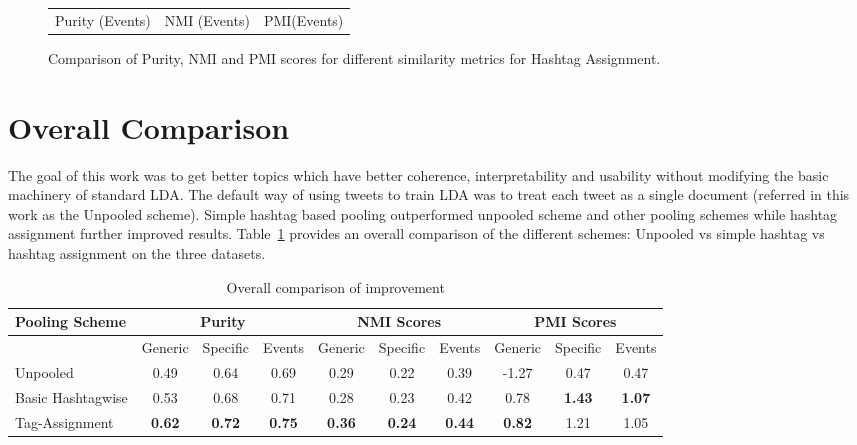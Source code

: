 \documentclass[10pt,a5paper,twoside]{article}
\begin{document}
\begin{figure}[t!]
\begin{center}
{\begin{tabular}{ccc}
		

		{\footnotesize Purity (Events)} & {\footnotesize NMI (Events)} & 
		{\footnotesize PMI(Events)}\\

	
	\end{tabular}
}
\end{center}
\vspace{-4mm}
\caption{\footnotesize Comparison of Purity, NMI and PMI scores for different similarity metrics for Hashtag Assignment.} \label{fig-1}
\end{figure}




\section{Overall Comparison}
The goal of this work was to get better topics which have better coherence, interpretability and usability without modifying the basic machinery of standard LDA. The default way of using tweets to train LDA was to treat each tweet as a single document (referred in this work as the Unpooled scheme). Simple hashtag based pooling outperformed unpooled scheme and other pooling schemes while hashtag assignment further improved results. Table~\ref{tbl-10} provides an overall comparison of the different schemes: Unpooled vs simple hashtag vs hashtag assignment on the three datasets.

\begin{table}[!h]
\centering
\resizebox{14cm}{!} 
{
	\begin{tabular}{|l|ccc|ccc|ccc|}
	\hline
	Pooling Scheme  & \multicolumn {3}{c}{Purity} & \multicolumn {3}{c}{NMI Scores} & \multicolumn {3}{c|}{PMI Scores}\\
	\hline
	 & Generic & Specific & Events &  Generic & Specific & Events &  Generic & Specific & Events\\
	\hline
	Unpooled & 0.49 & 0.64 & 0.69 & 0.29 & 0.22 & 0.39 & -1.27 & 0.47 & 0.47 \\
	\hline
	Basic Hashtagwise & 0.53 & 0.68 & 0.71 & 0.28 & 0.23 & 0.42 & 0.78 & \textbf{1.43} & \textbf{1.07} \\
	\hline
	Tag-Assignment & \textbf{0.62} & \textbf{0.72} & \textbf{0.75} & \textbf{0.36} & \textbf{0.24} & \textbf{0.44} & \textbf{0.82} & 1.21 & 1.05 \\
	\hline
	\end{tabular}
}
\caption{Overall comparison of improvement}\label{tbl-10}
\end{table}
\end{document}
